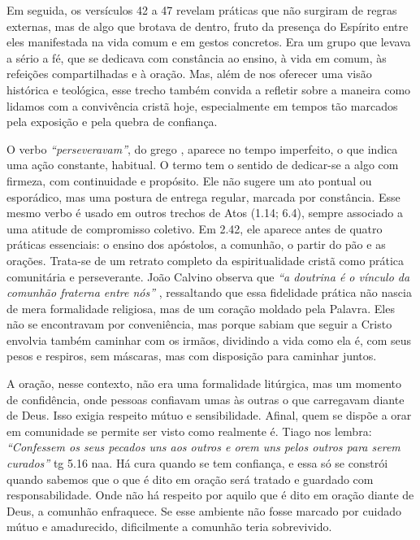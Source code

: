 Em seguida, os versículos 42 a 47 revelam práticas que não surgiram de regras externas, mas de algo que brotava de dentro, fruto da presença do Espírito entre eles manifestada na vida comum e em gestos concretos. Era um grupo que levava a sério a fé, que se dedicava com constância ao ensino, à vida em comum, às refeições compartilhadas e à oração. Mas, além de nos oferecer uma visão histórica e teológica, esse trecho também convida a refletir sobre a maneira como lidamos com a convivência cristã hoje, especialmente em tempos tão marcados pela exposição e pela quebra de confiança.

O verbo \textit{``perseveravam''}, do grego \textit{}, aparece no tempo imperfeito, o que indica uma ação constante, habitual. O termo tem o sentido de dedicar-se a algo com firmeza, com continuidade e propósito. Ele não sugere um ato pontual ou esporádico, mas uma postura de entrega regular, marcada por constância. Esse mesmo verbo é usado em outros trechos de Atos (1.14; 6.4), sempre associado a uma atitude de compromisso coletivo. Em 2.42, ele aparece antes de quatro práticas essenciais: o ensino dos apóstolos, a comunhão, o partir do pão e as orações. Trata-se de um retrato completo da espiritualidade cristã como prática comunitária e perseverante. João Calvino observa que \textit{``a doutrina é o vínculo da comunhão fraterna entre nós''} \cite{calvinoAtos2}, ressaltando que essa fidelidade prática não nascia de mera formalidade religiosa, mas de um coração moldado pela Palavra. Eles não se encontravam por conveniência, mas porque sabiam que seguir a Cristo envolvia também caminhar com os irmãos, dividindo a vida como ela é, com seus pesos e respiros, sem máscaras, mas com disposição para caminhar juntos.

A oração, nesse contexto, não era uma formalidade litúrgica, mas um momento de confidência, onde pessoas confiavam umas às outras o que carregavam diante de Deus. Isso exigia respeito mútuo e sensibilidade. Afinal, quem se dispõe a orar em comunidade se permite ser visto como realmente é. Tiago nos lembra: \textit{``Confessem os seus pecados uns aos outros e orem uns pelos outros para serem curados''} \gls{tg} 5.16 \gls{naa}. Há cura quando se tem confiança, e essa só se constrói quando sabemos que o que é dito em oração será tratado e guardado com responsabilidade. Onde não há respeito por aquilo que é dito em oração diante de Deus, a comunhão enfraquece. Se esse ambiente não fosse marcado por cuidado mútuo e amadurecido, dificilmente a comunhão teria sobrevivido.

